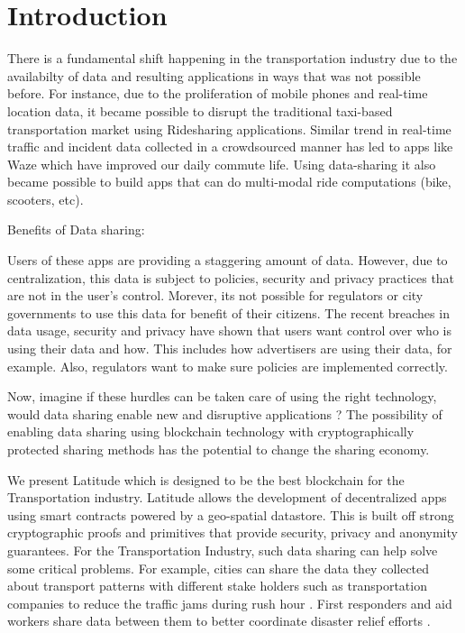 \section{Introduction}\label{sec:intro}

There is a fundamental shift happening in the transportation industry due to the availabilty of data and resulting
applications in ways that was not possible before. For instance, due to the proliferation of mobile phones and real-time
location data, it became possible to disrupt the traditional taxi-based transportation market using Ridesharing
applications. Similar trend in real-time traffic and incident data collected in a crowdsourced manner has led to apps
like Waze which have improved our daily commute life. Using data-sharing it also became possible to build apps that can
do multi-modal ride computations (bike, scooters, etc).

\noindent
{\textsf Benefits of Data sharing:}


Users of these apps are providing a staggering amount of data. However, due to centralization, this data is subject to
policies, security and privacy practices that are not in the user's control. Morever, its not possible for regulators or
city governments to use this data for benefit of their citizens. The recent breaches in data usage, security and privacy
have shown that users want control over who is using their data and how. This includes how advertisers are using their
data, for example. Also, regulators want to make sure policies are implemented correctly.

Now, imagine if these hurdles can be taken care of using the right technology, would data sharing enable new and
disruptive applications ? The possibility of enabling data sharing using blockchain technology with cryptographically
protected sharing methods has the potential to change the sharing economy.

We present Latitude which is designed to be the best blockchain for the Transportation industry. Latitude allows the
development of decentralized apps using smart contracts powered by a geo-spatial datastore. This is built off strong
cryptographic proofs and primitives that provide security, privacy and anonymity guarantees.  For the Transportation
Industry, such data sharing can help solve some critical problems.  For example, cities can share the data they
collected about transport patterns with different stake holders such as transportation companies to reduce the traffic
jams during rush hour \cite{traffic_jam}. First responders and aid workers share data between them to better coordinate
disaster relief efforts \cite{bharosa_2010}.

